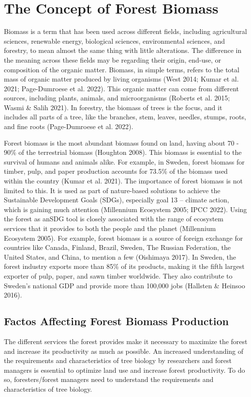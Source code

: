 \documentclass[11pt, a4paper]{report}
\begin{document}
\section{The Concept of Forest Biomass}
Biomass is a term that has been used across different fields, including agricultural sciences, renewable energy, biological sciences, environmental sciences, and forestry, to
mean almost the same thing with little alterations. The difference in the meaning across
these fields may be regarding their origin, end-use, or composition of the organic matter.
Biomass, in simple terms, refers to the total mass of organic matter produced by living
organisms (West 2014; Kumar et al. 2021; Page-Dumroese et al. 2022). This organic matter
can come from different sources, including plants, animals, and microorganisms
(Roberts et al. 2015; Wasmi \& Salih 2021). In forestry, the biomass of trees is the focus, and it includes all parts of a tree, like the branches, stem, leaves, needles, stumps, roots, and fine roots (Page-Dumroese et al. 2022).

Forest biomass is the most abundant biomass found on land, having about 70 - 90\% of the terrestrial biomass (Houghton 2008). This biomass is essential to the survival of humans and animals alike. For example, in Sweden, forest biomass for timber, pulp, and paper production accounts for 73.5\% of the biomass used within the country (Kumar et al. 2021). The importance of forest biomass is not limited to this. It is used as part of nature-based solutions to achieve the Sustainable Development Goals (SDGs), especially goal 13 – climate  action, which is gaining much attention (Millennium Ecosystem 2005; IPCC 2022). Using the forest as anSDG tool is closely associated with the range of ecosystem services that it  provides to both the people and the planet (Millennium Ecosystem 2005). For example, forest biomass is a source of foreign exchange for countries like Canada, Finland, Brazil, Sweden, The Russian Federation, the United States, and China, to mention a few (Oishimaya 2017). In Sweden, the forest industry exports more than 85\% of its products, making it the fifth largest exporter of pulp, paper, and sawn timber worldwide. They also contribute to Sweden’s  national GDP and provide more than 100,000 jobs (Hallsten \& Heinsoo 2016).

\subsection{Factos Affecting Forest Biomass Production}
The different services the forest provides make it necessary to maximize the forest and increase its productivity as much as possible. An increased understanding of the requirements and characteristics of tree biology by researchers and forest managers is essential to optimize land use and increase forest productivity. To do so, foresters/forest managers need to understand the requirements and characteristics of tree biology. 
\end{document}
